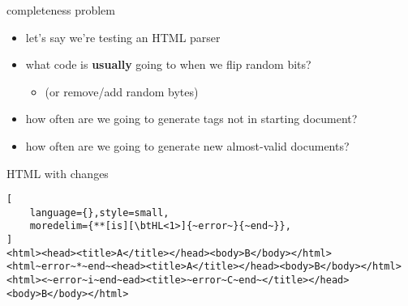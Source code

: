 
\begin{frame}{completeness problem}
    \begin{itemize}
        \item let's say we're testing an HTML parser
        \item what code is \textbf{usually} going to when we flip random bits?
            \begin{itemize} 
                \item (or remove/add random bytes)
            \end{itemize}
        \vspace{.5cm}
        \item<2> how often are we going to generate tags not in starting document?
        \item<2> how often are we going to generate new almost-valid documents?
    \end{itemize}
\end{frame}


\begin{frame}[fragile,label=HTMLchanges]{HTML with changes}
\begin{lstlisting}[
    language={},style=small,
    moredelim={**[is][\btHL<1>]{~error~}{~end~}},
]
<html><head><title>A</title></head><body>B</body></html>
<html~error~*~end~<head><title>A</title></head><body>B</body></html>
<html><~error~i~end~ead><title>~error~C~end~</title></head><body>B</body></html>
\end{lstlisting}
\end{frame}



